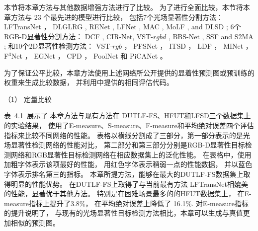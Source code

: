 




本节将本章方法与其他数据增强方法进行了比较。
为了进行全面比较，本节将本章方法与 23 个最先进的模型进行比较，
包括7个光场显著性分割方法：
LFTransNet ，
DLGLRG , RENet , LFNet ,
MAC , MoLF , and DLSD ;
%
%
%
%
6个RGB-D显著性分割方法：
DCF , CIR-Net, VST-$rgbd$  ,
BBS-Net     , SSF and S2MA    ;
%
%
%
%
%
和10个2D显著性检测方法：
VST-$rgb$ ，
PFSNet ，
ITSD ，
LDF ，
MINet ，
F$^{3}$Net  ， 
EGNet   ，
CPD  ，
PoolNet 和
PiCANet 。


%



为了保证公平比较，本章方法使用上述网络所公开提供的显着性预测图或预训练的权重来生成比较数据，
并利用中提供的相同评估代码。 





（1）
定量比较


表~4.1~展示了
本章方法与现有方法在
DUTLF-FS、HFUT和LFSD三个数据集上的实验结果，
使用了E-measure、S-measure、F-measure和平均绝对误差四个评估指标来比较不同网络的性能。
表格以横线分割成了三部分，第一部分表示的是光场显著性检测网络的性能对比，
第二部分和第三部分分别是RGB-D显著性目标检测网络和RGB显著性目标检测网络在相应数据集上的泛化性能。
在表格中，使用加粗字体表示该项最好的性能，
用红色字体表示稍弱一点的性能数据，
并以蓝色字体表示排名第三的指标。
本章所提方法，能够在最大的DUTLF-FS数据集上取得明显的性能优势。
在DUTLF-FS上取得了与当前最有方法
LFTransNet相媲美的性能，显著优于其他方法。
特别是在困难场景最多的的HFUT数据集上，
在E-measure指标上提升了3.8\%，
在平均绝对误差上降低了 16.1\%.
对E-measure指标的提升说明了，
与现有的光场显著性目标检测方法相比，本章可以生成与真值更加相似的预测图。



